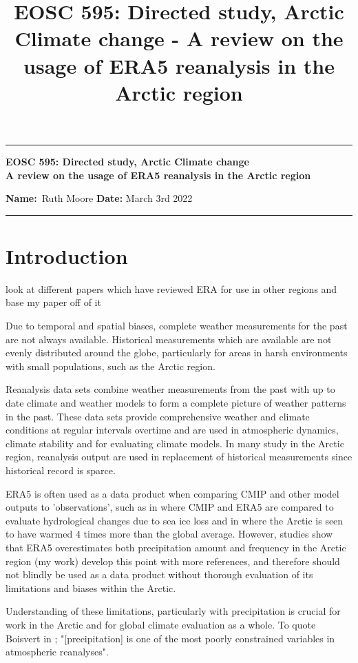 \documentclass[11pt, oneside]{article}
\title{EOSC 595: Directed study, Arctic Climate change - A review on the usage of ERA5 reanalysis in the Arctic region  }
\begin{document}
\begin{center}
	\hrule
	\vspace{.4cm}
	{\textbf { \large EOSC 595: Directed study, Arctic Climate change \\ A review on the usage of ERA5 reanalysis in the Arctic region}}
\end{center}
{\textbf{Name:}\ Ruth Moore \hspace{\fill} }\textbf{Date:} March 3rd 2022   \\
	\hrule


\hfill
\hfill
 \hfill
\hfill

\section{Introduction}

{\color{blue}look at different papers which have reviewed ERA for use in other regions and base my paper off of it}


Due to temporal and spatial biases, complete weather measurements for the past are not always available. Historical measurements which are available are not evenly distributed around the globe, particularly for areas in harsh environments with small populations, such as the Arctic region.

Reanalysis data sets combine weather measurements from the past with up to date climate and weather models to form a complete picture of weather patterns in the past. These data sets provide comprehensive weather and climate conditions at regular intervals overtime and are used in atmospheric dynamics, climate stability and for evaluating climate models. In many study in the Arctic region, reanalysis output are used in replacement of historical measurements since historical record is sparce.

ERA5 is often used as a data product when comparing CMIP and other model outputs to 'observations', such as in \cite{ford2022arctic} where CMIP and ERA5 are compared to evaluate hydrological changes due to sea ice loss and in \cite{rantanen2022arctic} where the Arctic is seen to have warmed 4 times more than the global average. However, studies show that ERA5 overestimates both precipitation amount and frequency in the Arctic region (my work) {\color{blue} develop this point with more references}, and therefore should not blindly be used as a data product without thorough evaluation of its limitations and biases within the Arctic. 

Understanding of these limitations, particularly with precipitation is crucial for work in the Arctic and for global climate evaluation as a whole. To quote Boisvert in \cite{boisvert2018intercomparison}; "[precipitation] is one of the most poorly constrained variables in atmospheric reanalyses". 
\end{document}
